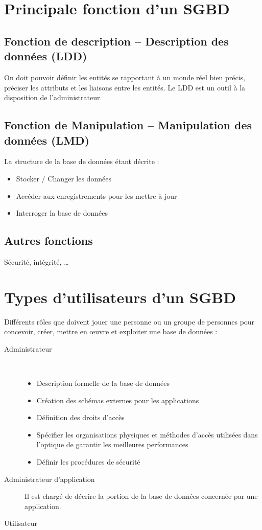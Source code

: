 \documentclass[12pt,a4paper,openany]{book}
\newcommand{\bd}{base de données}
\begin{document}
		\section{Principale fonction d'un SGBD}
		\subsection{Fonction de description -- Description des données (LDD)}
		On doit pouvoir définir les entités se rapportant à un monde réel bien précis, préciser les attributs et les liaisons entre les entités. Le LDD
		est un outil à la disposition de l'administrateur.

		\subsection{Fonction de Manipulation -- Manipulation des données (LMD)}
		La structure de la \bd{} étant décrite : 
		\begin{itemize}
			\item Stocker / Changer les données
			\item Accéder aux enregistrements pour les mettre à jour
			\item Interroger la \bd{}
		\end{itemize}

		\subsection{Autres fonctions}
		Sécurité, intégrité, \ldots

		\section{Types d'utilisateurs d'un SGBD}
		Différents rôles que doivent jouer une personne ou un groupe de personnes pour concevoir, créer, mettre en œuvre et exploiter une \bd{} :
		\begin{description}
			\item[Administrateur]~
				\begin{itemize}
					\item Description formelle de la \bd
					\item Création des schémas externes pour les applications
					\item Définition des droits d'accès
					\item Spécifier les organisations physiques et méthodes d'accès utilisées dans l'optique de garantir les meilleures performances
					\item Définir les procédures de sécurité
				\end{itemize}
			\item[Administrateur d'application] Il est chargé de décrire la portion de la base de données concernée par une application. 
			\item[Utilisateur] 
		\end{description}
\end{document}
